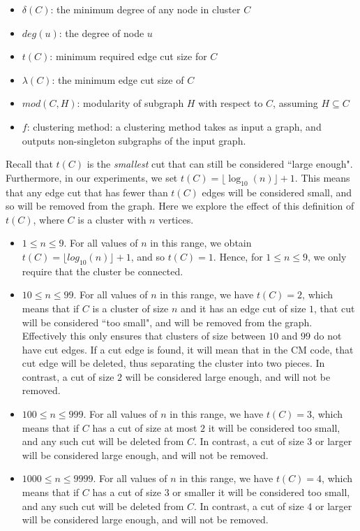 \documentclass[a4paper]{article}   	%
\begin{document}
\begin{itemize}
    \item $\delta(C)$: the minimum degree of  any node in cluster $C$
    \item $deg(u)$: the degree of node $u$
    \item $t(C)$: minimum required edge cut size for  $C$
    \item $\lambda(C)$: the minimum edge cut size of $C$
    \item $mod(C, H)$: modularity of subgraph $H$ with respect to $C$, assuming $H \subseteq C$
    \item $f$: clustering method: a clustering method takes as input a graph, and outputs non-singleton subgraphs of the input graph.
\end{itemize}

Recall that  $t(C)$ is the {\em smallest} cut that can still be considered ``large enough".
Furthermore, in our experiments, we set $t(C) = \lfloor \log_{10}(n) \rfloor +1$.  This means that any edge cut that has fewer than $t(C)$ edges
will be considered small, and so will be removed from the graph.
Here we explore the effect of this definition of $t(C)$, where $C$ is a cluster with $n$ vertices.
\begin{itemize}
\item
$1 \leq n \leq 9$.
For all values of $n$ in this range, we obtain $t(C) = \lfloor log_{10}(n) \rfloor +1$, and so $t(C) = 1$.  Hence, for $1 \leq n \leq 9$, we  only require that the
cluster be connected.
\item
$10 \leq n \leq 99$. For all values of $n$ in this range, we have
 $t(C) = 2$, which means that if $C$ is a cluster of size $n$ and it has an edge cut of size $1$, that  cut will
be considered ``too small", and will be removed from the graph.  Effectively this only ensures that clusters of size between $10$ and $99$ do not have cut edges.
If a cut edge is found, it will mean that in the CM code, that cut edge will be deleted, thus separating the cluster into two pieces.
In contrast, a cut of size $2$ will be considered large enough, and will not be removed.
\item
$100 \leq n \leq 999$.
For all values of $n$ in this range, we have $t(C)=3$, which means that if $C$ has a cut of size  at most $2$ it will be considered
too small, and any such cut will be deleted from $C$.
In contrast, a cut of size $3$  or larger will be considered large enough, and will not be removed.
\item
$1000 \leq n \leq 9999$.
For all values of $n$ in this range, we have $t(C)=4$, which means that if $C$ has a cut of size $3$ or smaller it will be considered
too small, and any such cut will be deleted from $C$.
In contrast, a cut of size $4$ or larger will be considered large enough, and will not be removed.
\end{itemize}
\end{document}
